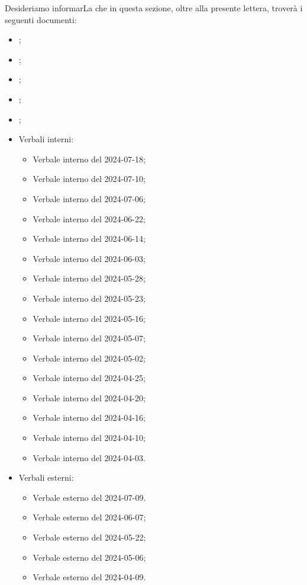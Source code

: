 \par Desideriamo informarLa che in questa sezione, oltre alla presente lettera, troverà i seguenti documenti:
\begin{itemize}
    \item \AnalisiDeiRequisiti;
    \item \Glossario;
    \item \NormeDiProgetto;
    \item \PianoDiProgetto;
    \item \PianoDiQualifica; 
    \item Verbali interni: 
        \begin{itemize}
            \item Verbale interno del 2024-07-18;
            \item Verbale interno del 2024-07-10;
            \item Verbale interno del 2024-07-06;
            \item Verbale interno del 2024-06-22;
            \item Verbale interno del 2024-06-14;
            \item Verbale interno del 2024-06-03;
            \item Verbale interno del 2024-05-28;
            \item Verbale interno del 2024-05-23;
            \item Verbale interno del 2024-05-16;
            \item Verbale interno del 2024-05-07;
            \item Verbale interno del 2024-05-02;
            \item Verbale interno del 2024-04-25;
            \item Verbale interno del 2024-04-20;
            \item Verbale interno del 2024-04-16;
            \item Verbale interno del 2024-04-10;
            \item Verbale interno del 2024-04-03.
        \end{itemize}
    \item Verbali esterni:
    \begin{itemize}
        \item Verbale esterno del 2024-07-09.
        \item Verbale esterno del 2024-06-07;
        \item Verbale esterno del 2024-05-22;
        \item Verbale esterno del 2024-05-06;
        \item Verbale esterno del 2024-04-09.
    \end{itemize}
\end{itemize}

